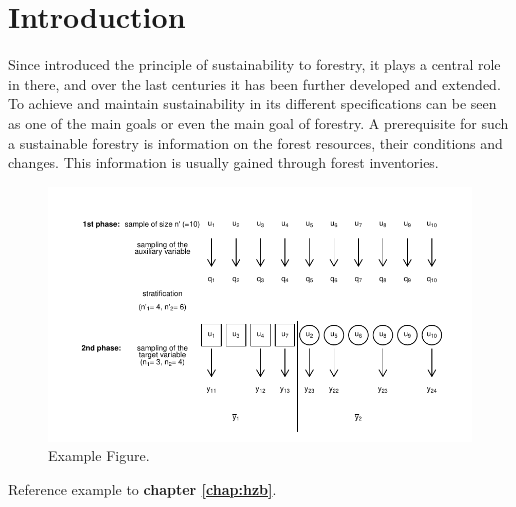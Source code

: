\chapter{Introduction}
\label{chap:Introduction}
Since \citet{Carlowitz_1713} introduced the principle of sustainability to forestry, it plays a central role in there, and over the last centuries it has been further developed and extended. To achieve and maintain sustainability in its different specifications \citep{Speidel_1984, Schanz_1996} can be seen as one of the main goals or even the main goal of forestry. A prerequisite for such a sustainable forestry is information on the forest resources, their conditions and changes. This information is usually gained through forest inventories.

\begin{figure}
\center
  \includegraphics[width=\textwidth]{Grafiken/Introduction/example.pdf}
\caption{Example Figure.}
\label{fig:Introduction:Floatchart_2st}
\end{figure}

Reference example to \textbf{chapter \ref{chap:hzb}}.
